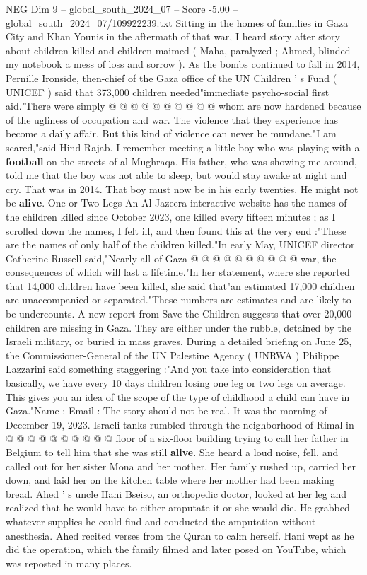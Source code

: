 \begin{textsample}{NEG Dim 9 – global\_south\_2024\_07 – Score -5.00 – global\_south\_2024\_07/109922239.txt}
Sitting in the homes of families in Gaza City and Khan Younis in the aftermath of that war, I heard story after story about children killed and children maimed ( Maha, paralyzed ; Ahmed, blinded -- my notebook a mess of loss and sorrow ).
As the bombs continued to fall in 2014, Pernille Ironside, then-chief of the Gaza office of the UN Children ' s Fund ( UNICEF ) said that 373,000 children needed"immediate psycho-social first aid."There were simply @ @ @ @ @ @ @ @ @ @ whom are now hardened because of the ugliness of occupation and war.
The violence that they experience has become a daily affair.
But this kind of violence can never be mundane."I am scared,"said Hind Rajab.
I remember meeting a little boy who was playing with a \textbf{football} on the streets of al-Mughraqa.
His father, who was showing me around, told me that the boy was not able to sleep, but would stay awake at night and cry.
That was in 2014.
That boy must now be in his early twenties.
He might not be \textbf{alive}.
One or Two Legs An Al Jazeera interactive website has the names of the children killed since October 2023, one killed every fifteen minutes ; as I scrolled down the names, I felt ill, and then found this at the very end :"These are the names of only half of the children killed."In early May, UNICEF director Catherine Russell said,"Nearly all of Gaza @ @ @ @ @ @ @ @ @ @ war, the consequences of which will last a lifetime."In her statement, where she reported that 14,000 children have been killed, she said that"an estimated 17,000 children are unaccompanied or separated."These numbers are estimates and are likely to be undercounts.
A new report from Save the Children suggests that over 20,000 children are missing in Gaza.
They are either under the rubble, detained by the Israeli military, or buried in mass graves.
During a detailed briefing on June 25, the Commissioner-General of the UN Palestine Agency ( UNRWA ) Philippe Lazzarini said something staggering :"And you take into consideration that basically, we have every 10 days children losing one leg or two legs on average.
This gives you an idea of the scope of the type of childhood a child can have in Gaza."Name : Email : The story should not be real.
It was the morning of December 19, 2023.
Israeli tanks rumbled through the neighborhood of Rimal in @ @ @ @ @ @ @ @ @ @ floor of a six-floor building trying to call her father in Belgium to tell him that she was still \textbf{alive}.
She heard a loud noise, fell, and called out for her sister Mona and her mother.
Her family rushed up, carried her down, and laid her on the kitchen table where her mother had been making bread.
Ahed ' s uncle Hani Bseiso, an orthopedic doctor, looked at her leg and realized that he would have to either amputate it or she would die.
He grabbed whatever supplies he could find and conducted the amputation without anesthesia.
Ahed recited verses from the Quran to calm herself.
Hani wept as he did the operation, which the family filmed and later posed on YouTube, which was reposted in many places.

\end{textsample}
